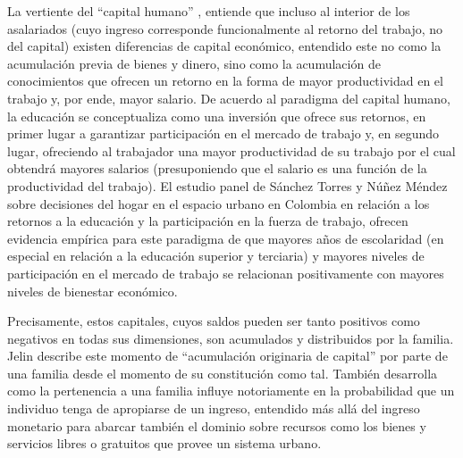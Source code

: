 La vertiente del “capital humano” \cite{mincer,beckar,schultz1961,schultz1962}, entiende que incluso al interior de los asalariados (cuyo ingreso corresponde funcionalmente al retorno del trabajo, no del capital) existen diferencias de capital económico, entendido este no como la acumulación previa de bienes y dinero, sino como la acumulación de conocimientos que ofrecen un retorno en la forma de mayor productividad en el trabajo y, por ende, mayor salario. De acuerdo al paradigma del capital humano, la educación se conceptualiza como una inversión que ofrece sus retornos, en primer lugar a garantizar participación en el mercado de trabajo y, en segundo lugar, ofreciendo al trabajador una mayor productividad de su trabajo por el cual obtendrá mayores salarios (presuponiendo que el salario es una función de la productividad del trabajo). El estudio panel de Sánchez Torres y Núñez Méndez \cite{sanchez} sobre decisiones del hogar en el espacio urbano en Colombia en relación a los retornos a la educación y la participación en la fuerza de trabajo, ofrecen evidencia empírica para este paradigma de que mayores años de escolaridad (en especial en relación a la educación superior y terciaria) y mayores niveles de participación en el mercado de trabajo se relacionan positivamente con mayores niveles de bienestar económico.
	
Precisamente, estos capitales, cuyos saldos pueden ser tanto positivos como negativos en todas sus dimensiones, son acumulados y distribuidos por la familia. Jelin describe este momento de “acumulación originaria de capital” por parte de una familia desde el momento de su constitución como tal. También desarrolla como la pertenencia a una familia influye notoriamente en la probabilidad que un individuo tenga de apropiarse de un ingreso, entendido más allá del ingreso monetario para abarcar también el dominio sobre recursos como los bienes y servicios libres o gratuitos que provee un sistema urbano.  
	
